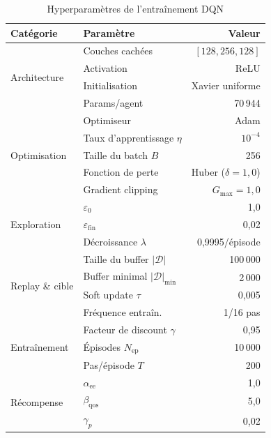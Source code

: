 \documentclass[conference]{IEEEtran}
\begin{document}
\begin{table}[H]
    \centering
    \caption{Hyperparamètres de l'entraînement DQN}
    \label{tab:hyperparams}
    \begin{tabular}{@{}llr@{}}
        \toprule
        \textbf{Catégorie} & \textbf{Paramètre} & \textbf{Valeur} \\
        \midrule
        \multirow{4}{*}{Architecture} 
            & Couches cachées & $[128, 256, 128]$ \\
            & Activation & ReLU \\
            & Initialisation & Xavier uniforme \\
            & Params/agent & 70\,944 \\
        \midrule
        \multirow{5}{*}{Optimisation}
            & Optimiseur & Adam \\
            & Taux d'apprentissage $\eta$ & $10^{-4}$ \\
            & Taille du batch $B$ & 256 \\
            & Fonction de perte & Huber ($\delta = 1{,}0$) \\
            & Gradient clipping & $G_{\max} = 1{,}0$ \\
        \midrule
        \multirow{3}{*}{Exploration}
            & $\varepsilon_0$ & 1,0 \\
            & $\varepsilon_{\text{fin}}$ & 0,02 \\
            & Décroissance $\lambda$ & 0,9995/épisode \\
        \midrule
        \multirow{4}{*}{Replay \& cible}
            & Taille du buffer $|\mathcal{D}|$ & 100\,000 \\
            & Buffer minimal $|\mathcal{D}|_{\min}$ & 2\,000 \\
            & Soft update $\tau$ & 0,005 \\
            & Fréquence entraîn. & 1/16 pas \\
        \midrule
        \multirow{3}{*}{Entraînement}
            & Facteur de discount $\gamma$ & 0,95 \\
            & Épisodes $N_{\text{ep}}$ & 10\,000 \\
            & Pas/épisode $T$ & 200 \\
        \midrule
        \multirow{3}{*}{Récompense}
            & $\alpha_{\text{ee}}$ & 1,0 \\
            & $\beta_{\text{qos}}$ & 5,0 \\
            & $\gamma_p$ & 0,02 \\
        \bottomrule
    \end{tabular}
\end{table}
\end{document}
